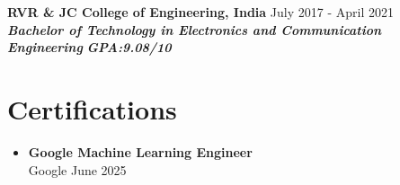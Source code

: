 \documentclass[a4paper,11pt]{article}
\begin{document}
\textbf{RVR \& JC College of Engineering, India} \hfill July 2017 - April 2021\\
\textbf{\textit{Bachelor of Technology in Electronics and Communication Engineering}} \hfill \textit{\textbf{GPA:9.08/10}}




\section{Certifications}
\begin{itemize}[nosep, after=\strut, leftmargin=0.8em, itemsep=0.8pt]
    \item \textbf{Google Machine Learning Engineer}\\
    Google \hfill June 2025\end{itemize}
\end{document}
